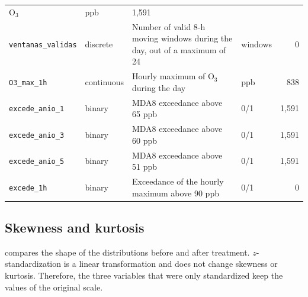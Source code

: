 \begin{table}[pos=t]
\begin{tabular}{llp{8.0cm}lr}
      O$_3$ & ppb & 1,591 \\
    \texttt{ventanas\_validas} & discrete & Number of valid 8-h moving windows
      during the day, out of a maximum of 24 & windows & 0 \\
    \texttt{O3\_max\_1h} & continuous & Hourly maximum of O$_3$ during the day
      & ppb & 838 \\
    \texttt{excede\_anio\_1} & binary & MDA8 exceedance above 65 ppb
      & 0/1 & 1,591 \\
    \texttt{excede\_anio\_3} & binary & MDA8 exceedance above 60 ppb
      & 0/1 & 1,591 \\
    \texttt{excede\_anio\_5} & binary & MDA8 exceedance above 51 ppb
      & 0/1 & 1,591 \\
    \texttt{excede\_1h} & binary & Exceedance of the hourly maximum above
      90 ppb & 0/1 & 0 \\
    \bottomrule
  \end{tabular}
\end{table}

\subsection{Skewness and kurtosis}
 compares the shape of the distributions before
and after treatment. $z$-standardization is a linear transformation and does
not change skewness or kurtosis. Therefore, the three variables that were only
standardized keep the values of the original scale.


